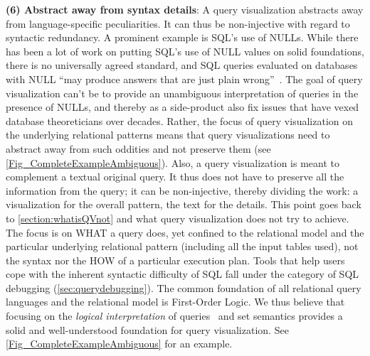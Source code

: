 \documentclass[letterpaper,11pt]{article}
\begin{document}
\textbf{(6) Abstract away from syntax details}:
%
A query visualization abstracts away from language-specific peculiarities.
It can thus be non-injective with regard to syntactic redundancy.
A prominent example is SQL's use of NULLs. 
While there has been a lot of work on putting SQL's use of NULL values on solid foundations,
there is no universally agreed standard, and 
SQL queries evaluated on databases with NULL ``may produce answers that are just plain wrong''~\cite{DBLP:journals/sigmod/GuagliardoL17}.
The goal of query visualization can't be to provide an unambiguous interpretation of queries in the presence of NULLs, 
and thereby as a side-product also fix issues that have vexed database theoreticians over decades.
Rather, the focus of query visualization on the underlying relational patterns means that query visualizations 
need to abstract away from such oddities and not preserve them
(see \autoref{Fig_CompleteExampleAmbiguous}).
Also, a query visualization is meant to complement a textual original query.
It thus does not have to preserve all the information from the query; it can be non-injective,
thereby dividing the work: a visualization for the overall pattern, the text for the details.
This point goes back to \autoref{section:whatisQVnot} and what query visualization does not try to achieve.
The focus is on WHAT a query does, 
yet confined to the relational model and the particular underlying relational pattern
(including all the input tables used), not the syntax nor the HOW of a particular execution plan.
Tools that help users cope with the inherent syntactic difficulty of SQL fall under the category of SQL debugging (\autoref{sec:querydebugging}).
The common foundation of all relational query languages and the relational model is
First-Order Logic.
%
%
%
%
We thus believe that focusing on the \emph{logical interpretation} of queries~\cite{DBLP:journals/bsl/HalpernHIKVV01} and set semantics 
provides a solid and well-understood foundation for query visualization.
See \autoref{Fig_CompleteExampleAmbiguous} for an example.














\end{document}

